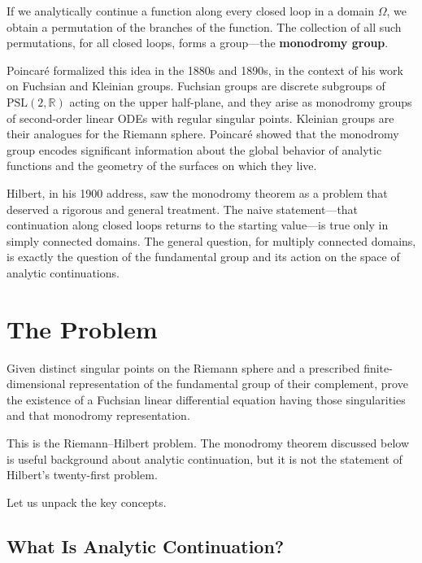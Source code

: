 If we analytically continue a function along every closed loop in a domain $\Omega$, we obtain a permutation of the branches of the function. The collection of all such permutations, for all closed loops, forms a group---the \textbf{monodromy group}.

Poincar\'e formalized this idea in the 1880s and 1890s, in the context of his work on Fuchsian and Kleinian groups. Fuchsian groups are discrete subgroups of $\mathrm{PSL}(2, \mathbb{R})$ acting on the upper half-plane, and they arise as monodromy groups of second-order linear ODEs with regular singular points. Kleinian groups are their analogues for the Riemann sphere. Poincar\'e showed that the monodromy group encodes significant information about the global behavior of analytic functions and the geometry of the surfaces on which they live.

Hilbert, in his 1900 address, saw the monodromy theorem as a problem that deserved a rigorous and general treatment. The naive statement---that continuation along closed loops returns to the starting value---is true only in simply connected domains. The general question, for multiply connected domains, is exactly the question of the fundamental group and its action on the space of analytic continuations.

\section{The Problem}

\begin{problem_statement}
Given distinct singular points on the Riemann sphere and a prescribed finite-dimensional representation of the fundamental group of their complement, prove the existence of a Fuchsian linear differential equation having those singularities and that monodromy representation.
\end{problem_statement}

This is the Riemann--Hilbert problem. The monodromy theorem discussed below is useful background about analytic continuation, but it is not the statement of Hilbert's twenty-first problem.

Let us unpack the key concepts.

\subsection{What Is Analytic Continuation?}


